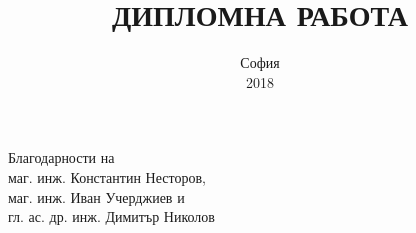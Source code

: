 \documentclass
[
	paper=A4,					%
	twoside=true,				%
	openany,
	parskip=full,				%
	chapterprefix=true,			%
	12pt,						%
	headings=normal,			%
	bibliography=totoc,			%
	listof=totoc,				%
	titlepage=on,				%
	captions=tableabove,		%
	draft=false,				%
]
{scrreprt}
\title{\Huge\hspace{1cm}\textbf{ДИПЛОМНА РАБОТА}\newline\newline\Large \thesisTitle}
\author{\thesisAuthor}
\date{\vspace{8.4cm}София\\2018}
\begin{document}
\pagestyle{plain}


\cleardoublepage

\cleardoublepage
\tableofcontents
\listoffigures
\listoftables

\begin{center}
    {\large \bigskip \bigskip Благодарности на\\маг. инж. Константин Несторов,\\маг. инж. Иван Учерджиев и\\гл. ас. др. инж. Димитър Николов}
\end{center}

\pagestyle{maincontentstyle}









\nocite{mcu_man}
\begin{singlespace}
    \printbibliography[title=\foreignlanguage{bulgarian}{Библиография}]
\end{singlespace}
\end{document}
